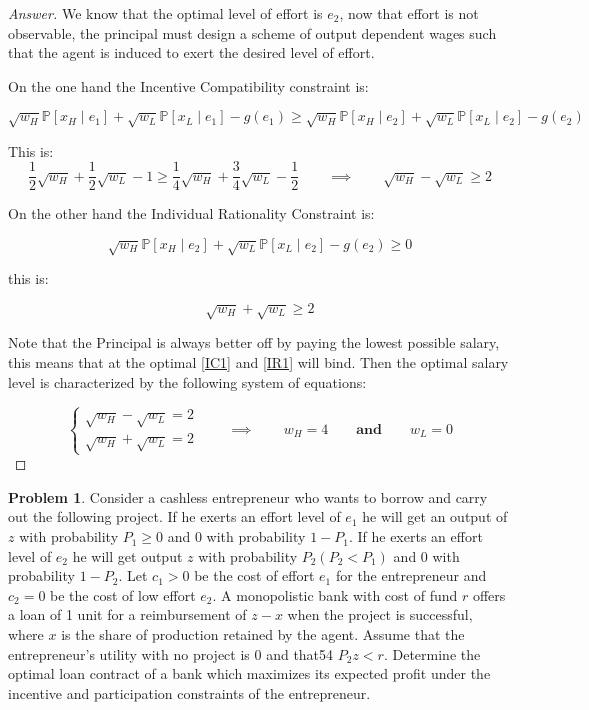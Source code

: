 \documentclass[12pt]{article}
\theoremstyle{definition}
\newtheorem{problem}{Problem}
\newcommand{\qiq}{\qquad \implies \qquad}
\newcommand{\qaq}{\qquad \textbf{and} \qquad}
\begin{document}
\begin{proof}[Answer]
We know that the optimal level of effort is $e_2$, now that effort is not observable, the principal must design a scheme of output dependent wages such that the agent is induced to exert the desired level of effort.

On the one hand the Incentive Compatibility constraint is:

$$\sqrt{w_H}\mathbb{P}[x_H\mid e_1] + \sqrt{w_L}\mathbb{P}[x_L\mid e_1] - g(e_1) \geq  \sqrt{w_H}\mathbb{P}[x_H\mid e_2] + \sqrt{w_L}\mathbb{P}[x_L\mid e_2] - g(e_2)$$

This is:
\begin{equation}\tag{IC}\label{IC1}
    \frac{1}{2}\sqrt{w_H} + \frac{1}{2}\sqrt{w_L} - 1\geq\frac{1}{4}\sqrt{w_H} + \frac{3}{4}\sqrt{w_L} - \frac{1}{2} \qiq \sqrt{w_H} - \sqrt{w_L}\geq 2
\end{equation}

On the other hand the Individual Rationality Constraint is:

$$\sqrt{w_H}\mathbb{P}[x_H \mid e_2] + \sqrt{w_L}\mathbb{P}[x_L\mid e_2] - g(e_2) \geq 0 $$

this is:

\begin{equation}\tag{IR}\label{IR1}
    \sqrt{w_H} + \sqrt{w_L} \geq 2
\end{equation}

Note that the Principal is always better off by paying the lowest possible salary, this means that at the optimal \eqref{IC1} and \eqref{IR1} will bind. Then the optimal salary level is characterized by the following system of equations:

$$\left\{\begin{array}{cc}
     \sqrt{w_H} - \sqrt{w_L}=2 \\
     \sqrt{w_H} + \sqrt{w_L} = 2
\end{array}\qiq \boxed{w_H = 4}\right. \qaq \boxed{w_L = 0}$$

\end{proof}
\begin{problem}
Consider a cashless entrepreneur who wants to borrow and carry out the following project. If he exerts an effort level of $e_{1}$ he will get an output of $z$ with probability $P_{1} \geq 0$ and 0 with probability $1-P_{1}$. If he exerts an effort level of $e_{2}$ he will get output $z$ with probability $P_{2}\left(P_{2}<P_{1}\right)$ and 0 with probability $1-P_2$. Let $c_{1}>0$ be the cost of effort $e_{1}$ for the entrepreneur and $c_{2}=0$ be the cost of low effort $e_{2} .$ A monopolistic bank with cost of fund $r$ offers a loan of 1 unit for a reimbursement of $z-x$ when the project is successful, where $x$ is the share of production retained by the agent. Assume that the entrepreneur's utility with no project is 0 and that54
$P_{2} z<r .$ Determine the optimal loan contract of a bank which maximizes its expected profit under the incentive and participation constraints of the entrepreneur.
\end{problem}
\end{document}
